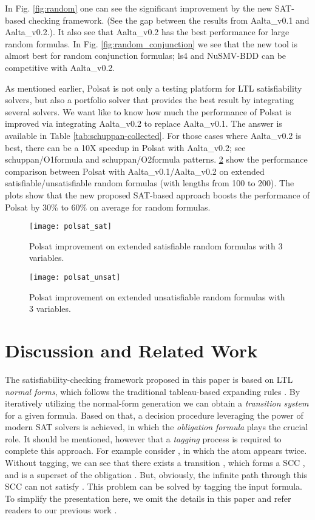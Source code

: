 \documentclass[conference]{IEEEtran}
\def\Aalta{{Aalta}}
\begin{document}
In Fig. \ref{fig:random} one can see the significant improvement 
by the new SAT-based checking framework. (See the gap between the results 
from \Aalta\_v0.1 and \Aalta\_v0.2.). It also see that \Aalta\_v0.2 has 
the best performance for large random formulas. 
In Fig. \ref{fig:random_conjunction} we see that the new tool is almost
best for random conjunction formulas; ls4 and NuSMV-BDD can be competitive
with \Aalta\_v0.2. 

As mentioned earlier, Polsat is not only a testing platform for LTL 
satisfiability solvers, but also a portfolio solver that provides the best 
result by integrating several solvers. We want like to know  how much the 
performance of Polsat is improved via integrating \Aalta\_v0.2 to replace 
\Aalta\_v0.1.  The answer is available in 
Table \ref{tab:schuppan-collected}. For those cases where \Aalta\_v0.2 is
best, there can be a 10X speedup in Polsat with \Aalta\_v0.2;
see \textsf{schuppan/O1formula} and \textsf{schuppan/O2formula} patterns.
\ref{fig:polsat_unsat} show the performance comparison between Polsat with 
\Aalta\_v0.1/\Aalta\_v0.2 on extended satisfiable/unsatisfiable random 
formulas (with lengths from 100 to 200). 
The plots show that the new proposed SAT-based approach boosts the 
performance of Polsat  by 30\% to 60\% on average for random formulas. 

\begin{figure}
\centering
\texttt{[image: polsat\_sat]}
\caption{Polsat improvement on extended satisfiable random formulas with 3 variables.}
\label{fig:polsat_sat}
\end{figure}

\begin{figure}
\centering
\texttt{[image: polsat\_unsat]}
\caption{Polsat improvement on extended unsatisfiable random formulas with 3 variables.}
\label{fig:polsat_unsat}
\end{figure}


\section{Discussion and Related Work}\label{sec:related} 

The satisfiability-checking framework proposed in this paper is based on LTL 
\textit{normal forms}, which follows the traditional tableau-based expanding 
rules \cite{GPVW95}. By iteratively utilizing the normal-form generation we can 
obtain a \textit{transition system} for a given formula. 
Based on that, a decision procedure leveraging the power of modern SAT solvers is 
achieved, in which the \textit{obligation formula} plays the crucial role. 
It should be mentioned, however that a \emph{tagging} process is required to 
complete this approach.  For example consider , in which 
the atom  appears twice.  Without tagging, we can see that there exists a transition
, which forms a SCC , and
 is a superset of the obligation . 
But, obviously, the infinite path through this SCC can not satisfy
. This problem can be solved by tagging the input formula. To simplify 
the presentation here, we omit the details in this paper and refer readers to 
our previous work \cite{LZPVH13}.
  
\end{document}
